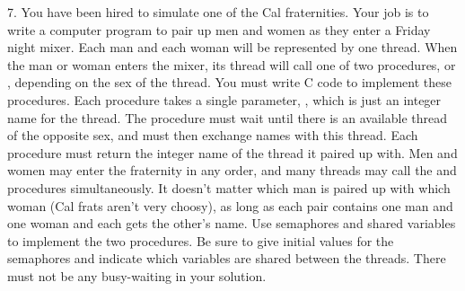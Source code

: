 \item{7.} You have been hired to simulate one of the Cal fraternities.
Your job is to write a computer program to pair up men and women
as they enter a Friday night mixer.  Each man and each woman will
be represented by one thread.  When the man or woman enters the
mixer, its thread will call one of two procedures, \fIman\fR
or \fIwoman\fR, depending on the sex of the thread.  You must
write C code to implement these procedures.  Each procedure takes
a single parameter, \fIname\fR, which is just an integer name for
the thread.  The procedure must wait until there is an available
thread of the opposite sex, and must then exchange names
with this thread.
Each procedure must return the integer name of the thread
it paired up with.  Men and women may enter the fraternity
in any order, and many threads may call the \fIman\fR and
\fIwoman\fR procedures simultaneously.  It doesn't matter
which man is paired up with which woman (Cal frats aren't
very choosy), as long as each pair contains one man and one woman
and each gets the other's name.  Use semaphores and shared
variables to implement the two procedures.  Be sure to
give initial values for the semaphores and indicate which
variables are shared between the threads.  There must
not be any busy-waiting in your solution.
